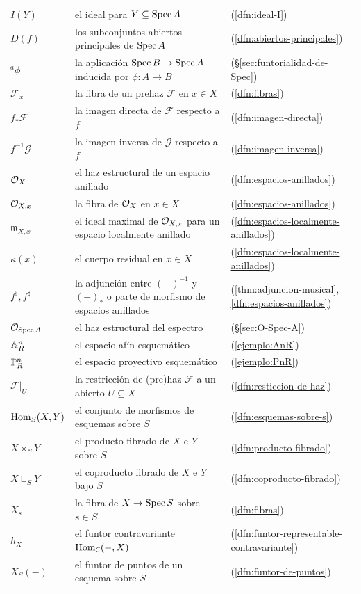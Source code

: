 \documentclass{article}
\numberwithin{equation}{section}
\theoremstyle{definition}
\begin{document}
\begin{tabular}{lll}
  $I(Y)$ & el ideal para $Y \subseteq \Spec A$ & (\ref{dfn:ideal-I}) \\
  $D(f)$ & los subconjuntos abiertos principales de $\Spec A$ & (\ref{dfn:abiertos-principales}) \\
  ${}^a \phi$ & la aplicación $\Spec B \to \Spec A$ inducida por $\phi\colon A\to B$ & (\S \ref{sec:funtorialidad-de-Spec}) \\
  $\mathcal{F}_x$ & la fibra de un prehaz $\mathcal{F}$ en $x\in X$ & (\ref{dfn:fibras}) \\
  $f_* \mathcal{F}$ & la imagen directa de $\mathcal{F}$ respecto a $f$ & (\ref{dfn:imagen-directa}) \\
  $f^{-1} \mathcal{G}$ & la imagen inversa de $\mathcal{G}$ respecto a $f$ & (\ref{dfn:imagen-inversa}) \\
  $\O_X$ & el haz estructural de un espacio anillado & (\ref{dfn:espacios-anillados}) \\
  $\O_{X,x}$ & la fibra de $\O_X$ en $x \in X$ & (\ref{dfn:espacios-anillados}) \\
  $\mathfrak{m}_{X,x}$ & el ideal maximal de $\O_{X,x}$ para un espacio localmente anillado & (\ref{dfn:espacios-localmente-anillados}) \\
  $\kappa (x)$ & el cuerpo residual en $x\in X$ & (\ref{dfn:espacios-localmente-anillados}) \\
  $f^\flat, f^\sharp$ & la adjunción entre $(-)^{-1}$ y $(-)_*$ o parte de morfismo de espacios anillados & (\ref{thm:adjuncion-musical}, \ref{dfn:espacios-anillados}) \\
  $\O_{\Spec A}$ & el haz estructural del espectro & (\S\ref{sec:O-Spec-A}) \\
  $\AA^n_R$ & el espacio afín esquemático & (\ref{ejemplo:AnR}) \\
  $\PP^n_R$ & el espacio proyectivo esquemático & (\ref{ejemplo:PnR}) \\
  $\mathcal{F}|_U$ & la restricción de (pre)haz $\mathcal{F}$ a un abierto $U \subseteq X$ & (\ref{dfn:resticcion-de-haz}) \\
  $\Hom_S (X,Y)$ & el conjunto de morfismos de esquemas sobre $S$ & (\ref{dfn:esquemas-sobre-s})\\
  $X\times_S Y$ & el producto fibrado de $X$ e $Y$ sobre $S$ & (\ref{dfn:producto-fibrado}) \\
  $X\sqcup_S Y$ & el coproducto fibrado de $X$ e $Y$ bajo $S$ & (\ref{dfn:coproducto-fibrado}) \\
  $X_s$ & la fibra de $X\to \Spec S$ sobre $s\in S$ & (\ref{dfn:fibras}) \\
  $h_X$ & el funtor contravariante $\Hom_\vcateg{C} (-,X)$ & (\ref{dfn:funtor-representable-contravariante}) \\
  $X_S (-)$ & el funtor de puntos de un esquema sobre $S$ & (\ref{dfn:funtor-de-puntos})
\end{tabular}


\pagebreak

{\small}
\end{document}
